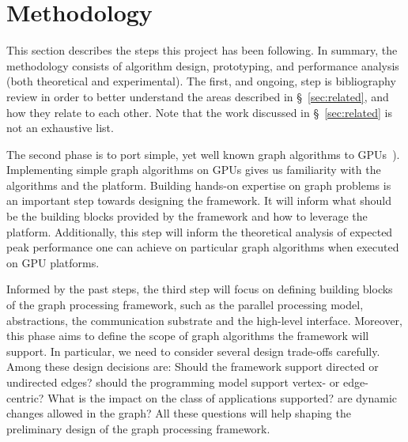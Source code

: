 \section{Methodology}
\label{sec:methodology}
This section describes the steps this project has been following. In summary, the methodology consists of algorithm design, prototyping, and performance analysis (both theoretical and experimental).
The first, and ongoing, step is bibliography review in order to better understand the areas described in \S~\ref{sec:related}, and how they relate to each other. Note that the work discussed in \S~\ref{sec:related} is not an exhaustive list. 

The second phase is to port simple, yet well known graph algorithms to GPUs~\cite{Quinn1984,Meyer2003,Harish2007,Malewicz2009,Sungpack2010}). Implementing simple graph algorithms on GPUs gives us familiarity with the algorithms and the platform. Building hands-on expertise on graph problems is an important step towards designing the framework. It will inform what should be the building blocks provided by the framework and how to leverage the platform. Additionally, this step will inform the theoretical analysis of expected peak performance one can achieve on particular graph algorithms when executed on GPU platforms.

Informed by the past steps, the third step will focus on defining building blocks of the graph processing framework, such as the parallel processing model, abstractions, the communication substrate and the high-level interface. Moreover, this phase aims to define the scope of graph algorithms the framework will support. In particular, we need to consider several design trade-offs carefully. Among these design decisions are: Should the framework support directed or undirected edges? should the programming model support vertex- or edge-centric? What is the impact on the class of applications supported? are dynamic changes allowed in the graph? All these questions will help shaping the preliminary design of the graph processing framework.
